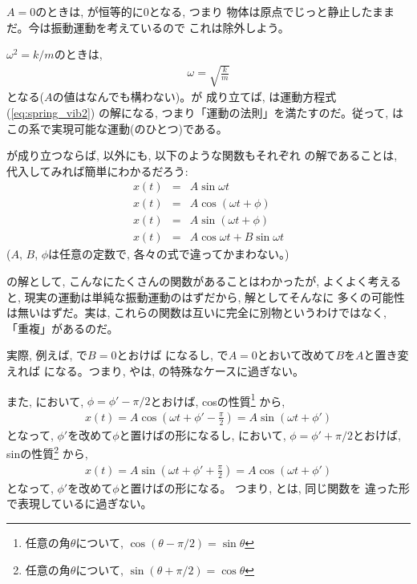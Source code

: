 $A=0$のときは, が恒等的に0となる, つまり
物体は原点でじっと静止したままだ。今は振動運動を考えているので
これは除外しよう。

$\omega^2=k/m$のときは, 
\begin{eqnarray}
\omega=\sqrt{\frac{k}{m}}\label{eq:spring_vib_defomega}
\end{eqnarray}
となる($A$の値はなんでも構わない)。が
成り立てば, は運動方程式(\ref{eq:spring_vib2})
の解になる, つまり「運動の法則」を満たすのだ。従って, は
この系で実現可能な運動(のひとつ)である。

が成り立つならば, 
以外にも, 以下のような関数もそれぞれ
の解であることは, 代入してみれば簡単にわかるだろう:
\begin{eqnarray}
x(t)&=&A\sin\omega t\label{eq:spring_Asin}\\
x(t)&=&A\cos(\omega t+\phi)\label{eq:spring_Acosphi}\\
x(t)&=&A\sin(\omega t+\phi)\label{eq:spring_Asinphi}\\
x(t)&=&A\cos\omega t+B\sin\omega t\label{eq:spring_AcosBsin}
\end{eqnarray}
($A$, $B$, $\phi$は任意の定数で, 各々の式で違ってかまわない。)

の解として, こんなにたくさんの関数があることはわかったが, 
よくよく考えると, 現実の運動は単純な振動運動のはずだから, 解としてそんなに
多くの可能性は無いはずだ。実は, これらの関数は互いに完全に別物というわけではなく, 
「重複」があるのだ。

実際, 例えば, で$B=0$とおけば
になるし, で$A=0$とおいて改めて$B$を$A$と置き変えれば
になる。つまり, やは, 
の特殊なケースに過ぎない。

また, において, $\phi=\phi'-\pi/2$とおけば, 
cosの性質\footnote{任意の角$\theta$について, $\cos(\theta-\pi/2)=\sin\theta$}
から, 
\begin{eqnarray*}
x(t)=A\cos(\omega t+\phi'-\frac{\pi}{2})=A\sin(\omega t+\phi')
\end{eqnarray*}
となって, $\phi'$を改めて$\phi$と置けばの形になるし, 
において, $\phi=\phi'+\pi/2$とおけば, 
sinの性質\footnote{任意の角$\theta$について, $\sin(\theta+\pi/2)=\cos\theta$}
から, 
\begin{eqnarray*}
x(t)=A\sin(\omega t+\phi'+\frac{\pi}{2})=A\cos(\omega t+\phi')
\end{eqnarray*}
となって, $\phi'$を改めて$\phi$と置けばの形になる。
つまり, とは, 同じ関数を
違った形で表現しているに過ぎない。

